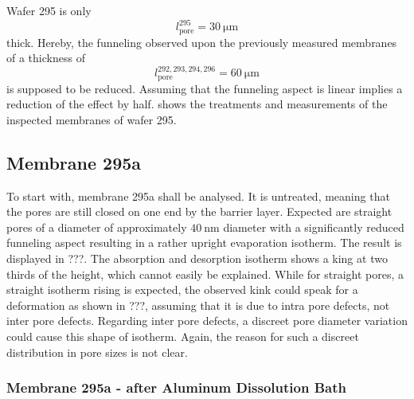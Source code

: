 \documentclass[thesis.tex]{subfiles}
\begin{document}
        Wafer 295 is only
        \begin{equation}
            l^{295}_\mathrm{pore}=\SI{30}{\micro\meter}
        \end{equation}
        thick. Hereby, the funneling observed upon the previously measured membranes of a thickness of
        \begin{equation}
            l^{292,293,294,296}_\mathrm{pore}=\SI{60}{\micro\meter}
        \end{equation}
        is supposed to be reduced. Assuming that the funneling aspect is linear implies a reduction of the effect by half.  shows the treatments and measurements of the inspected membranes of wafer 295.

        

        \subsection{Membrane 295a}

            To start with, membrane 295a shall be analysed. It is untreated, meaning that the pores are still closed on one end by the barrier layer. Expected are straight pores of a diameter of approximately
            $\SI{40}{\nano\meter}$ diameter with a significantly reduced funneling aspect resulting in a rather upright evaporation isotherm. The result is displayed in ???. The absorption and desorption isotherm shows a king at two thirds of the height, which cannot easily be explained. While for straight pores, a straight isotherm rising is expected, the observed kink could speak for a deformation as shown in ???, assuming that it is due to intra pore defects, not inter pore defects. Regarding inter pore defects, a discreet pore diameter variation could cause this shape of isotherm. Again, the reason for such a discreet distribution in pore sizes is not clear.


            \subsubsection{Membrane 295a - after Aluminum Dissolution Bath}
\end{document}
